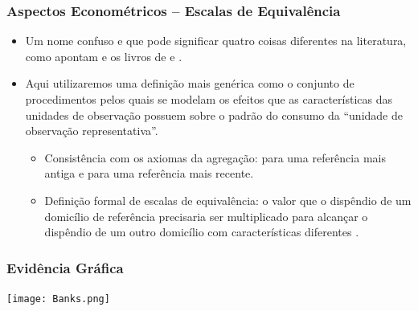 \documentclass{beamer}
\begin{document}
\begin{frame}[fragile]\frametitle{Aspectos Econométricos -- Escalas de Equivalência}

\label{Equiv_Sc}

\begin{itemize}[<+->]
	\item Um nome confuso e que pode significar quatro coisas diferentes na literatura, como apontam \citet{Lewbel1997} e os livros de \citet{pollak_wales92} e \citet{DeatonBook80}.
	\item Aqui utilizaremos uma definição mais genérica como o conjunto de procedimentos pelos quais se modelam os efeitos que as características das unidades de observação possuem sobre o padrão do consumo da ``unidade de observação representativa''.
	\begin{itemize}[<+->]
		\item Consistência com os axiomas da agregação: \citet{Pollak1981} para uma referência mais antiga e \citet{Ray1983a} para uma referência mais recente.
		\item Definição formal de escalas de equivalência: o valor que o dispêndio de um domicílio de referência precisaria ser multiplicado para alcançar o dispêndio de um outro domicílio com características diferentes \citep{Lewbel1997}.
	\end{itemize}
\end{itemize}
    
\hyperlink{Econometrics}{}


\end{frame}

\begin{frame}[fragile]\frametitle{Evidência Gráfica}
\label{Graf_ev}
	\texttt{[image: Banks.png]}
	\hyperlink{QUAIDS}{}
    
\end{frame}

\begin{frame}[allowframebreaks]



\end{frame}

\end{document}
